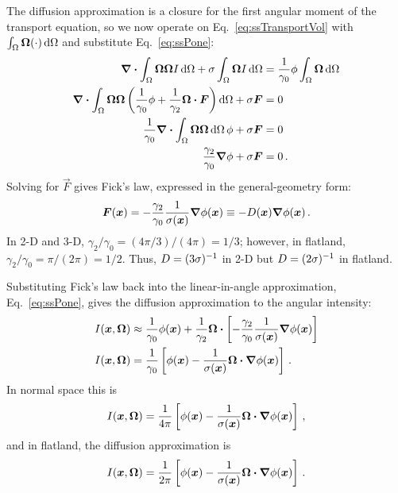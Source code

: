 The diffusion approximation is a closure for the first angular moment of
the transport equation, so we now operate on Eq.~\eqref{eq:ssTransportVol} with
$\int_\Omega \bm{\Omega} (\cdot) \mathop{}\!\mathrm{d} \Omega$ and substitute
Eq.~\eqref{eq:ssPone}:
\begin{align*}
  \bm{\nabla} \bm{\cdot} \int_\Omega \bm{\Omega} \bm{\Omega} I
  \mathop{}\!\mathrm{d}\Omega
  + \sigma \int_\Omega \bm{\Omega} I \mathop{}\!\mathrm{d}\Omega
  &= \frac{1}{\gamma_0} \phi \int_\Omega \bm{\Omega} \mathop{}\!\mathrm{d}\Omega
  \\
  \bm{\nabla} \bm{\cdot} \int_\Omega \bm{\Omega} \bm{\Omega} \left(
  \frac{1}{\gamma_0}\phi + \frac{1}{\gamma_2} \bm{\Omega} \bm{\cdot} \bm{F}
  \right)
  \mathop{}\!\mathrm{d}\Omega
  + \sigma \bm{F}
  &= 0
  \\
  \frac{1}{\gamma_0} \bm{\nabla} \bm{\cdot} \int_\Omega \bm{\Omega} \bm{\Omega}
  \mathop{}\!\mathrm{d}\Omega\, \phi 
  + \sigma \bm{F} &= 0
  \\
  \frac{\gamma_2}{\gamma_0} \bm{\nabla} \phi + \sigma \bm{F} &= 0 \,.
\end{align*}
Solving for $\vec{F}$ gives Fick's law, expressed in the general-geometry form:
\begin{equation} \label{eq:fickGeneral}
  \bm{F}(\bm{x})
  = - \frac{\gamma_2}{\gamma_0} \frac{1}{\sigma(\bm{x})} \bm{\nabla} \phi(\bm{x})
  \equiv -D(\bm{x}) \bm{\nabla} \phi(\bm{x})\,.
\end{equation}
In 2-D and 3-D, $\gamma_2/\gamma_0 = (4\pi / 3) / (4\pi) = 1/3$; however, in
flatland, $\gamma_2/\gamma_0 = \pi / (2\pi) = 1/2$. Thus, $D=(3\sigma)^{-1}$ in
2-D but $D=(2\sigma)^{-1}$ in flatland.

Substituting Fick's law back into the linear-in-angle approximation,
Eq.~\eqref{eq:ssPone}, gives the diffusion approximation to the angular
intensity:
\begin{align} \nonumber
  I(\bm{x}, \bm{\Omega})
  &\approx \frac{1}{\gamma_0} \phi(\bm{x})
  + \frac{1}{\gamma_2} \bm{\Omega} \bm{\cdot} \left[ - \frac{\gamma_2}{\gamma_0}
  \frac{1}{\sigma(\bm{x})} \bm{\nabla} \phi(\bm{x}) \right]
  \\ \label{eq:diffusionIntensity}
  I(\bm{x}, \bm{\Omega})
  &= \frac{1}{\gamma_0} \left[ \phi(\bm{x})
  - \frac{1}{\sigma(\bm{x})}
  \bm{\Omega} \bm{\cdot} \bm{\nabla} \phi(\bm{x}) \right] \,.
\end{align}
In normal space this is
\begin{equation*}
 I(\bm{x}, \bm{\Omega})
= \frac{1}{4\pi} \left[ \phi(\bm{x}) - \frac{1}{\sigma(\bm{x})} \bm{\Omega}
\bm{\cdot} \bm{\nabla} \phi(\bm{x}) \right] \,,
\end{equation*}
and in flatland, the diffusion approximation is
\begin{equation}\label{eq:flatlandDiffusion}
 I(\bm{x}, \bm{\Omega})
= \frac{1}{2\pi} \left[ \phi(\bm{x}) - \frac{1}{\sigma(\bm{x})} \bm{\Omega}
\bm{\cdot} \bm{\nabla} \phi(\bm{x}) \right]\,.
\end{equation}

